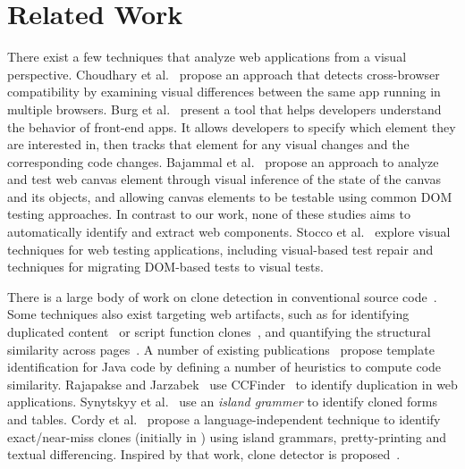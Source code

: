 
\section{Related Work}
\label{section:related-work}

There exist a few techniques that analyze web applications from a visual perspective.
Choudhary et al.~\cite{choudhary2012crosscheck} propose an approach that detects cross-browser compatibility by examining visual differences between the same app running in multiple browsers.
Burg et al.~\cite{burg2015explaining} present a tool that helps developers understand the behavior of front-end apps. It allows developers to specify which element they are  interested in, then tracks that element for any visual changes and the corresponding code changes.
Bajammal et al.~\cite{canvas_icst2018} propose an approach to analyze and test web canvas element through visual inference of the state of the canvas and its objects, and allowing canvas elements to be testable using common DOM testing approaches.
In contrast to our work, none of these studies aims to automatically identify and extract web components. Stocco et al.~\cite{2018-Stocco-FSE, 2018-Leotta-STVR} explore visual techniques for web testing applications, including visual-based test repair and techniques for migrating DOM-based tests to visual tests.

There is a large body of work on clone detection 
in conventional source code~\cite{Roy:2007:CloneSurvey, Roy:2009:ComparisonOfCloneDetectionTechniques, Rattan:2013:CloneDetectionSystematicReview}. Some techniques also exist targeting web artifacts, such as for identifying duplicated content~\cite{Boldyreff:2002:ReverseEngineeringMaintainableWWW} or
script function clones~\cite{Lanubile:2003:FindingFunctionClones, Calefato:2004:FunctionCloneDetection},
and quantifying the structural similarity across pages~\cite{DeLucia:2005:UnderstandingClonedPatterns}.
A number of existing publications~\cite{template_1, template_2, template_3, template_4} propose template identification for Java code by defining a number of heuristics to compute code similarity.
Rajapakse and Jarzabek~\cite{Rajapakse:2005:AnInvestigationOfCloning} use CCFinder~\cite{Kamiya:2002:CCFinder}
to identify duplication in web applications.
Synytskyy et al.~\cite{Synytskyy:2003:ResolutionOfStatic} use an \textit{island grammer} 
to identify cloned \html forms and tables.
Cordy et al.~\cite{Cordy:2004:PracticalLanguageIndependent} propose a language-independent technique
to identify exact/near-miss clones (initially in \html) using island grammars, pretty-printing and textual differencing. 
Inspired by that work, \nicad clone detector is proposed~\cite{Roy:2008:NiCad}.

